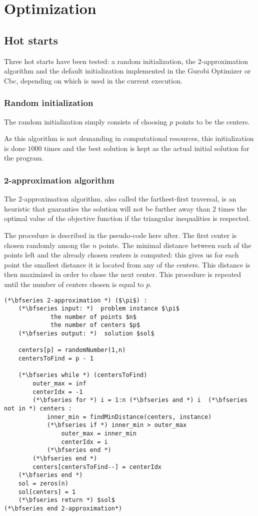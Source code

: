 \documentclass[a4paper,10pt]{article}
\begin{document}
\section{Optimization}
\subsection{Hot starts}
Three hot starts have been tested: a random initialization, the 2-approximation algorithm and the default initialization implemented in the Gurobi Optimizer or Cbc, depending on which is used in the current execution.

\subsubsection{Random initialization}

The random initialization simply consists of choosing $p$ points to be the centers.

As this algorithm is not demanding in computational resources, this initialization is done $1000$ times and the best solution is kept as the actual initial solution for the program.

\subsubsection{2-approximation algorithm}

The 2-approximation algorithm, also called the farthest-first traversal, is an heuristic that guaranties the solution will not be further away than 2 times the optimal value of the objective function if the triangular inequalities is respected. 

The procedure is described in the pseudo-code here after. The first center is chosen randomly among the $n$ points. The minimal distance between each of the points left and the already chosen centers is computed: this gives us for each point the smallest distance it is located from any of the centers. This distance is then maximized in order to chose the next center. This procedure is repeated until the number of centers chosen is equal to $p$.

\begin{lstlisting}[mathescape=true]
(*\bfseries 2-approximation *) ($\pi$) :
    (*\bfseries input: *)  problem instance $\pi$
             the number of points $n$
             the number of centers $p$
    (*\bfseries output: *)  solution $sol$
    
    centers[p] = randomNumber(1,n)
    centersToFind = p - 1
    
    (*\bfseries while *) (centersToFind)
        outer_max = inf
        centerIdx = -1
        (*\bfseries for *) i = 1:n (*\bfseries and *) i  (*\bfseries not in *) centers :
            inner_min = findMinDistance(centers, instance)
            (*\bfseries if *) inner_min > outer_max
                outer_max = inner_min
                centerIdx = i
            (*\bfseries end *)
        (*\bfseries end *)
        centers[centersToFind--] = centerIdx
    (*\bfseries end *)
    sol = zeros(n)
    sol[centers] = 1
    (*\bfseries return *) $sol$
(*\bfseries end 2-approximation*)
\end{lstlisting}
\end{document}
